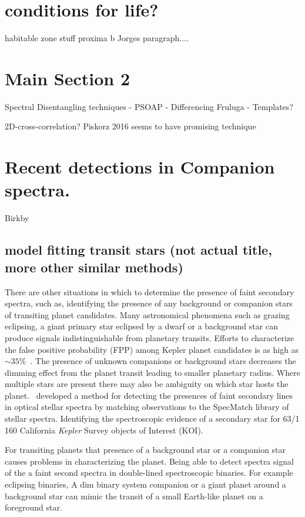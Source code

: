 \section{ conditions for life?}
habitable zone stuff
proxima b
Jorges paragraph.... 

\section{Main Section 2}


Spectral Disentangling techniques
- PSOAP
- Differencing Fruluga
- Templates?


2D-cross-correlation?   Piskorz 2016 seems to have promising technique


\section{Recent detections in Companion spectra.}

Birkby


\subsection{model fitting transit stars (not actual title, more other similar methods)}
There are other situations in which to determine the presence of faint secondary spectra, such as, identifying the presence of any background or companion stars of transiting planet candidates. Many astronomical phenomena such as grazing eclipsing, a giant primary star eclipsed by a dwarf or a background star can produce signals indistinguishable from planetary transits. Efforts to characterize the false positive probability (FPP) among Kepler planet candidates is as high as $\sim35\%$~\citep{santerne_sophie_2012}. The presence of unknown companions or background stars decreases the dimming effect from the planet transit leading to smaller planetary radius. Where multiple stars are present there may also be ambiguity on which star hosts the planet.~\citet{kolbl_detection_2015} developed a method for detecting the presences of faint secondary lines in optical stellar spectra by matching observations to the SpecMatch library of stellar spectra. Identifying the spectroscopic evidence of a secondary star for 63/1\,160 California \emph{Kepler} Survey objects of Interest (KOI).


For transiting planets that presence of a background star or a companion star causes problems in characterizing the planet. Being able to detect spectra signal of the a faint second spectra in double-lined spectroscopic binaries.
For example eclipsing binaries,
A dim binary system companion or a giant planet around a background star can mimic the transit of a small Earth-like planet on a foreground star.






